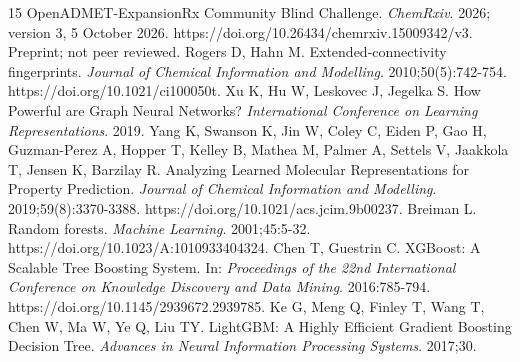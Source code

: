 \documentclass[
]{article}
\begin{document}
\begin{thebibliography}{15}
  OpenADMET-ExpansionRx Community Blind Challenge. \emph{ChemRxiv}. 2026;
  version 3, 5 October 2026. https://doi.org/10.26434/chemrxiv.15009342/v3.
  Preprint; not peer reviewed.
  Rogers D, Hahn M. Extended-connectivity fingerprints. \emph{Journal of
  Chemical Information and Modelling}. 2010;50(5):742-754.
  https://doi.org/10.1021/ci100050t.
  Xu K, Hu W, Leskovec J, Jegelka S. How Powerful are Graph Neural
  Networks? \emph{International Conference on Learning Representations}.
  2019.
  Yang K, Swanson K, Jin W, Coley C, Eiden P, Gao H, Guzman-Perez A,
  Hopper T, Kelley B, Mathea M, Palmer A, Settels V, Jaakkola T, Jensen
  K, Barzilay R. Analyzing Learned Molecular Representations for
  Property Prediction. \emph{Journal of Chemical Information and
  Modelling}. 2019;59(8):3370-3388.
  https://doi.org/10.1021/acs.jcim.9b00237.
  Breiman L. Random forests. \emph{Machine Learning}. 2001;45:5-32.
  https://doi.org/10.1023/A:1010933404324.
  Chen T, Guestrin C. XGBoost: A Scalable Tree Boosting System. In:
  \emph{Proceedings of the 22nd International Conference on Knowledge
  Discovery and Data Mining}. 2016:785-794.
  https://doi.org/10.1145/2939672.2939785.
  Ke G, Meng Q, Finley T, Wang T, Chen W, Ma W, Ye Q, Liu TY. LightGBM:
  A Highly Efficient Gradient Boosting Decision Tree. \emph{Advances in
  Neural Information Processing Systems}. 2017;30.
\end{thebibliography}
\end{document}
